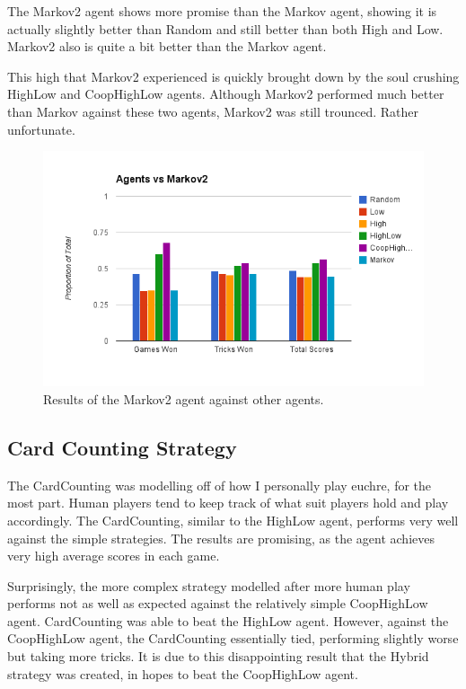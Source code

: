 The Markov2 agent shows more promise than the Markov agent, showing it is actually slightly better than Random and still better
than both High and Low. Markov2 also is quite a bit better than the Markov agent.

This high that Markov2 experienced is quickly brought down by the soul crushing HighLow and CoopHighLow agents. Although Markov2
performed much better than Markov against these two agents, Markov2 was still trounced. Rather unfortunate.

\begin{figure}[h]
    \centering
    \includegraphics[scale=0.5]{data/markov2.png}
    \caption{Results of the Markov2 agent against other agents.}
    \label{fig:results_markov2}
\end{figure}


\subsection{Card Counting Strategy}

The CardCounting was modelling off of how I personally play euchre, for the most part. Human players tend to keep track of what suit
players hold and play accordingly. The CardCounting, similar to the HighLow agent, performs very well against the simple strategies.
The results are promising, as the agent achieves very high average scores in each game.


Surprisingly, the more complex strategy modelled after more human play performs not as well as expected against the relatively simple
CoopHighLow agent. CardCounting was able to beat the HighLow agent. However, against the CoopHighLow agent, the CardCounting
essentially tied, performing slightly worse but taking more tricks. It is due to this disappointing result that the Hybrid strategy
was created, in hopes to beat the CoopHighLow agent.

